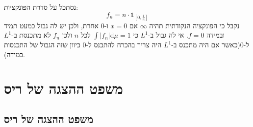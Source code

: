 \documentclass{tstextbook}
\begin{document}
\begin{example}
נסתכל על סדרת הפונקציות:
$$f_{n}=n\cdot \mathbb{1} _{\left[ 0,\frac{1}{n} \right]}$$
נקבל כי הפונקציה הנקודתית תהיה \(\infty\) אם \(x=0\) ו-0 אחרת, ולכן יש לה גבול כמעט תמיד ובמידה \(f=0\). אי לה גבול ב-\(L^{1}\) כי \(\int\lvert f_{n} \rvert \mathrm{d}\mu =1\) לכל \(n\) ולכן \(f_{n}\) לא מתכנסת ב-\(L^{1}\) ל-0(כאשר אם היה מתכנס ב-\(L^{1}\) היה צריך בהכרח להתכנס ל-0 כיוון שזה הגבול של התכנסות במידה). 

\end{example}
\section{משפט ההצגה של ריס}

\subsection{משפט ההצגה של ריס}
\end{document}
